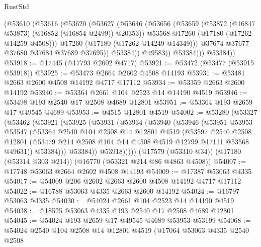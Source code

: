 \begin{lexlean}{RustStd}
\begin{coremodule}
{\begin{coremodule}
{{{{{{{{{{{{{{{{{{{{{{{{{{{{{{{{{{{{{{{{{{{{{{{{{{{{{{{                  (@53610
                    (@53616
                      (@53620
                        (@53627
                          (@53646
                            (@53656
                              (@53659 (@53872 (@16847 @53873) (@16852 (@16854 @2499)) @20353))
                              @53568
                              @17260
                              (@17180 (@17262 @14259 @4508)))
                            @17260
                            (@17180 (@17262 @14249 @14349)))
                          @37674
                          @37677
                          @37680
                          @37684
                          @37689
                          @37695))
                      @53384))
                  @49583))
              @53384)))
        @53384))
@53918 := @17445 (@17793 @2602 @4717)
@53921 := @53472 (@53477 (@53915 @53918))
@53925 := @53473 @2664 @2602 @4508 @14193
@53931 := @53481 @2663 @2600 @4508 @14192 @4717 @17112
@53934 := @53359 @2663 @2600 @14192
@53940 := @53364 @2661 @104 @2523 @14 @14190 @4519
@53946 := @53498 @193 @2540 @17 @2508 @4689 @12801
@53951 := @53364 @193 @2659 @17 @49545 @4689
@53953 := @4515 @12801 @4519
@54002 := @53280
    (@53327
      (@53462
        (@53921
          (@53925
            (@53931
              (@53934
                (@53940
                  (@53946
                    (@53951
                      @53953
                      @53547
                      (@53364
                        @2540
                        @104
                        @2508
                        @14
                        @12801
                        @4519
                        (@53597
                          @2540
                          @2508
                          @12801
                          (@53479 @214 @2508 @104 @14 @4508 @4519 @12799 @17111 @53568 @49631))
                        @53384)))
                  @53384))
              @53918)))))
    (@17579 (@53310 @34))
    (@17180 (@53314 @303 @214))
    (@16770 (@53321 @214 @86 @4863 @4508))
@54007 := @17748 @53063 @2664 @2602 @4508 @14193
@54009 := @17387 @53063 @4335
@54017 := @54009 @206 @2602 @2663 @2600 @4508 @14192 @4717 @17112
@54022 := @16788 @53063 @4335 @2663 @2600 @14192
@54024 := @16797 @53063 @4335
@54030 := @54024 @2661 @104 @2523 @14 @14190 @4519
@54038 := @18525 @53063 @4335 @193 @2540 @17 @2508 @4689 @12801
@54045 := @54024 @193 @2659 @17 @49545 @4689 @53953 @53199
@54068 := @54024
    @2540
    @104
    @2508
    @14
    @12801
    @4519
    (@17064
      @53063
      @4335
      @2540
      @2508
}}}}}}}}}}}}}}}}}}}}}}}}}}}}}}}}}}}}}}}}}}}}}}}}}}}}}}}
\end{coremodule}}
\end{coremodule}
\end{lexlean}

